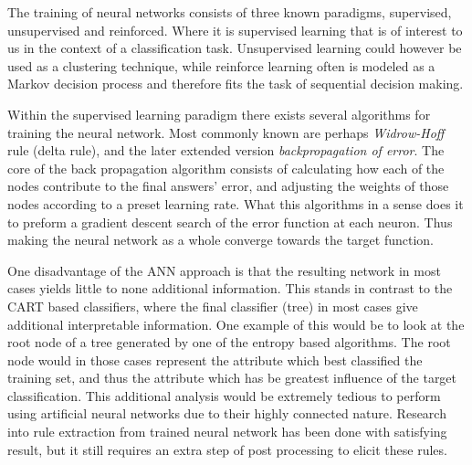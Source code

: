 	
	\bigskip\noindent
	The training of neural networks consists of three known paradigms, supervised, unsupervised and reinforced. 
	Where it is supervised learning that is of interest to us in the context of a classification task. 
	Unsupervised learning could however be used as a clustering technique, 
	while reinforce learning often is modeled as a Markov decision process and therefore fits the task of sequential decision making. \cite{bioAI}
	
	\bigskip\noindent
	Within the supervised learning paradigm there exists several algorithms for training the neural network. 
	Most commonly known are perhaps \textit{Widrow-Hoff} rule (delta rule)\cite{widrowhoff}, and the later extended version \textit{backpropagation of error}\cite{rumelhart1986learning}\cite{rumelhart1986parallel}. 
	The core of the back propagation algorithm consists of calculating how each of the nodes contribute to the final answers' error, 
	and adjusting the weights of those nodes according to a preset learning rate. 
	What this algorithms in a sense does it to preform a gradient descent search of the error function at each neuron.
	Thus making the neural network as a whole converge towards the target function. 
	
	\bigskip\noindent
	One disadvantage of the ANN approach is that the resulting network in most cases yields little to none additional information.
	This stands in contrast to the CART based classifiers, where the final classifier (tree) in most cases give additional interpretable information. 
	One example of this would be to look at the root node of a tree generated by one of the entropy based algorithms.
	The root node would in those cases represent the attribute which best classified the training set, 
	and thus the attribute which has be greatest influence of the target classification. 
	This additional analysis would be extremely tedious to perform using artificial neural networks due to their highly connected nature.
	Research into rule extraction from trained neural network has been done with satisfying result, 
	but it still requires an extra step of post processing to elicit these rules.~\cite{augastarule}
	
	
	
	
	
	